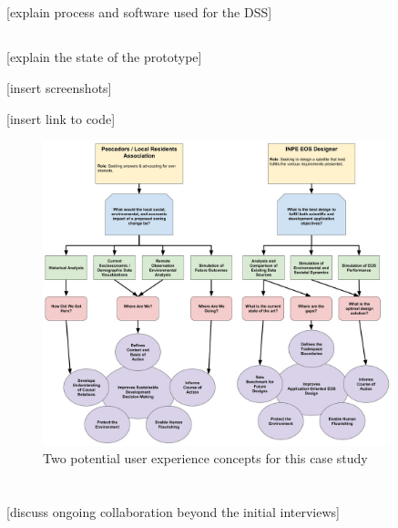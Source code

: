 \subsection{}

[explain process and software used for the DSS]

\subsection{} \label{sec:rio-dss-results}

[explain the state of the prototype]

[insert screenshots]

[insert link to code]

\begin{figure}[H] 
\centering
\includegraphics[width=0.9\textwidth]{Figures/chap4/concept_flow.jpg}
\caption[Two potential user experience concepts for the Rio de Janeiro case study]{Two potential user experience concepts for this case study}
\label{fig:concept_flow}
\end{figure}

\section{} \label{sec:rio-collab}


[discuss ongoing collaboration beyond the initial interviews]


\section{} \label{sec:rio-discussion}


